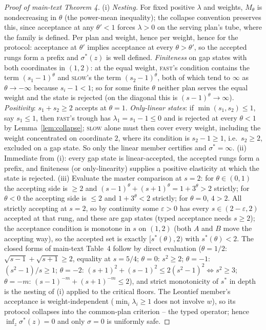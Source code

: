 \documentclass[preprint,11pt,authoryear]{elsarticle}
\theoremstyle{remark}
\newcommand{\act}[1]{\textsc{#1}}
\begin{document}
\begin{proof}[Proof of main-text Theorem 4]
(i) \emph{Nesting.} For fixed positive $\lambda$ and weights, $M_\theta$ is nondecreasing in $\theta$ (the power-mean inequality); the collapse convention preserves this, since acceptance at any $\theta'<1$ forces $\lambda>0$ on the serving plan's tube, where the family is defined. Per plan and weight, hence per weight, hence for the protocol: acceptance at $\theta'$ implies acceptance at every $\theta>\theta'$, so the accepted rungs form a prefix and $\sigma^*(z)$ is well defined. \emph{Finiteness} on gap states with both coordinates in $(1,2)$: at the equal weight, \act{fast}'s condition contains the term $(s_1-1)^\theta$ and \act{slow}'s the term $(s_2-1)^\theta$, both of which tend to $\infty$ as $\theta\to-\infty$ because $s_i-1<1$; so for some finite $\theta$ neither plan serves the equal weight and the state is rejected (on the diagonal this is $(s-1)^\theta\to\infty$). \emph{Positivity}: $s_1+s_2\ge2$ accepts at $\theta=1$. \emph{Only-linear states}: if $\min(s_1,s_2)\le1$, say $s_1\le1$, then \act{fast}'s trough has $\lambda_1=s_1-1\le0$ and is rejected at every $\theta<1$ by Lemma~\ref{lem:collapse}; \act{slow} alone must then cover every weight, including the weight concentrated on coordinate $2$, where its condition is $s_2-1\ge1$, i.e.\ $s_2\ge2$, excluded on a gap state. So only the linear member certifies and $\sigma^*=\infty$.
(ii) Immediate from (i): every gap state is linear-accepted, the accepted rungs form a prefix, and finiteness (or only-linearity) supplies a positive elasticity at which the state is rejected.
(iii) Evaluate the master comparison at $s=2$: for $\theta\in(0,1)$ the accepting side is $\ge2$ and $(s-1)^\theta+(s+1)^\theta=1+3^\theta>2$ strictly; for $\theta<0$ the accepting side is $\le2$ and $1+3^\theta<2$ strictly; for $\theta=0$, $4>2$. All strictly accepting at $s=2$, so by continuity some $\varepsilon>0$ has every $s\in(2-\varepsilon,2)$ accepted at that rung, and these are gap states (typed acceptance needs $s\ge2$); the acceptance condition is monotone in $s$ on $(1,2)$ (both $A$ and $B$ move the accepting way), so the accepted set is exactly $[s^*(\theta),2)$ with $s^*(\theta)<2$. The closed forms of main-text Table~4 follow by direct evaluation ($\theta=1/2$: $\sqrt{s-1}+\sqrt{s+1}\ge2$, equality at $s=5/4$; $\theta=0$: $s^2\ge2$; $\theta=-1$: $(s^2-1)/s\ge1$; $\theta=-2$: $(s+1)^2+(s-1)^2\le2(s^2-1)^2\iff s^2\ge3$; $\theta=-m$: $(s-1)^{-m}+(s+1)^{-m}\le2$), and strict monotonicity of $s^*$ in depth is the nesting of (i) applied to the critical floors. The Leontief member's acceptance is weight-independent ($\min_i\lambda_i\ge1$ does not involve $w$), so its protocol collapses into the common-plan criterion -- the typed operator; hence $\inf_z\sigma^*(z)=0$ and only $\sigma=0$ is uniformly safe.
\end{proof}
\end{document}
